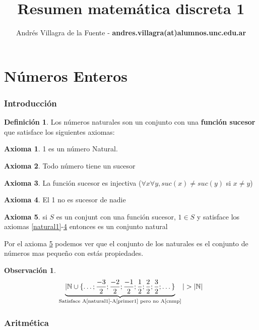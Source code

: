 \documentclass[9pt,a4paper,draft]{article}
\title{Resumen matemática discreta 1}
\author{Andrés Villagra de la Fuente - {\bfseries  andres.villagra(at)alumnos.unc.edu.ar}}
\theoremstyle{definition}
\newtheorem{defi}{Definición}
\newtheorem{axi}{Axioma}
\theoremstyle{plain}
\newtheorem{obs}{Observación}
\begin{document}
\maketitle

\part{Números Enteros}

\section{Introducción}

\begin{defi} Los números naturales son un conjunto con una {\bfseries función  sucesor} que satisface los siguientes axiomas: \end{defi}

\begin{axi} \label{natual1}1 es un número Natural. \end{axi}
\begin{axi} \label{suc}Todo número tiene un sucesor\end{axi}
\begin{axi} \label{sucind}La función sucesor es injectiva ($\forall x \forall y, suc(x) \neq suc(y)$ si $x \neq y$)\end{axi}
\begin{axi} \label{primer1}El 1 no es sucesor de nadie\end{axi}
\begin{axi} \label{cnmp}si $S$ es un conjunt con una función sucesor, $1 \in S$ y satisface los axiomas \ref{natural1}-\ref{primer1} entonces es un conjunto natural\end{axi}

Por el axioma \ref{cnmp} podemos ver que el conjunto de los naturales es el conjunto de números mas pequeño con estás propiedades.

\begin{obs}
\begin{equation*}
\underbrace{|\mathbb{N}\cup\{\dots;\frac{-3}{2};\frac{-2}{2};\frac{-1}{2};\frac{1}{2};\frac{2}{2};\frac{3}{2};\dots\}}_\text{Satisface A\ref{natural1}-A\ref{primer1} pero no A\ref{cnmp}}|>|\mathbb{N}|
\end{equation*}
\end{obs}

\section{Aritmética}
\end{document}
